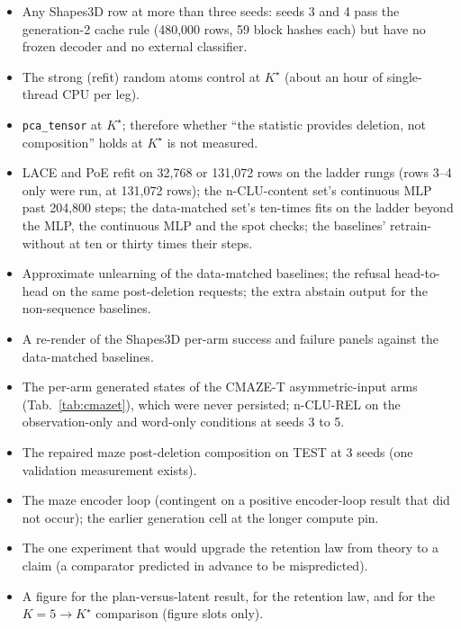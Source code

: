 \documentclass{article} %
\newcommand{\Kstar}{\ensuremath{K^{\star}}}
\begin{document}
\begin{itemize}[leftmargin=*,itemsep=1pt]
\item Any Shapes3D row at more than three seeds: seeds 3 and 4 pass the generation-2 cache rule
  (480,000 rows, 59 block hashes each) but have no frozen decoder and no external classifier.
\item The strong (refit) random atoms control at $\Kstar$ (about an hour of
  single-thread CPU per leg). %
\item \texttt{pca\_tensor} at $\Kstar$; therefore whether ``the statistic provides deletion,
not composition'' holds at $\Kstar$ is not measured.
\item LACE and PoE refit on 32,768 or 131,072 rows on the ladder rungs (rows 3--4 only were run, at %
  131,072 rows); the n-CLU-content set's continuous MLP past 204,800 steps; the data-matched set's ten-times fits on the ladder %
  beyond the MLP, the continuous MLP and the spot checks; the baselines' retrain-without at ten or
  thirty times their steps.
\item Approximate unlearning of the data-matched baselines; the refusal head-to-head on the same
  post-deletion requests; the extra abstain output for the non-sequence baselines.
\item A re-render of the Shapes3D per-arm success and failure panels against the data-matched baselines.
\item The per-arm generated states of the CMAZE-T asymmetric-input arms (Tab.~\ref{tab:cmazet}),
  which were never persisted; n-CLU-REL on the observation-only and word-only
  conditions at seeds 3 to 5.
\item The repaired maze post-deletion composition on TEST at 3 seeds (one validation measurement
  exists).
\item The maze encoder loop (contingent on a positive encoder-loop result that did not occur); the
  earlier generation cell at the longer compute pin.
\item The one experiment that would upgrade the retention law from theory to a claim (a comparator
  predicted in advance to be mispredicted).
\item A figure for the plan-versus-latent result, for the retention law, and for the $K=5\to\Kstar$
  comparison (figure slots only).
\end{itemize}

\end{document}
